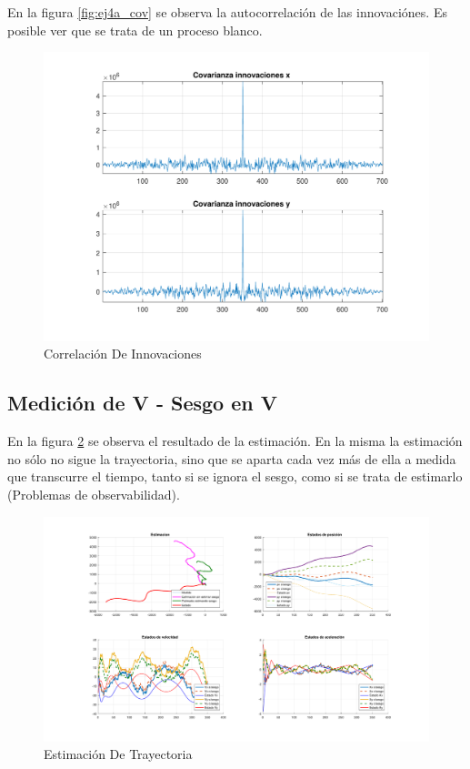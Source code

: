 	En la figura \ref{fig:ej4a_cov} se observa la autocorrelación de las innovaciónes. Es posible ver que se trata de un proceso blanco.
	
	\begin{figure}[H]
		\centering
		\includegraphics[width=1.0\textwidth,keepaspectratio]{Figuras/covinn_ej4b.pdf}
		\caption{Correlación De Innovaciones}
		\label{fig:ej4b_cov}
	\end{figure}
	
	
\subsection{Medición de V - Sesgo en V}

	En la figura \ref{fig:ej4c} se observa el resultado de la estimación. En la misma la estimación no sólo no sigue la trayectoria, sino que se aparta cada vez más de ella a medida que transcurre el tiempo, tanto si se ignora el sesgo, como si se trata de estimarlo (Problemas de observabilidad).

	\begin{figure}[H]
		\centering
		\includegraphics[scale=0.5,trim={6,5cm 0 0 0}]{Figuras/graf_ej4c.pdf}
		\caption{Estimación De Trayectoria}
		\label{fig:ej4c}
	\end{figure}
	

